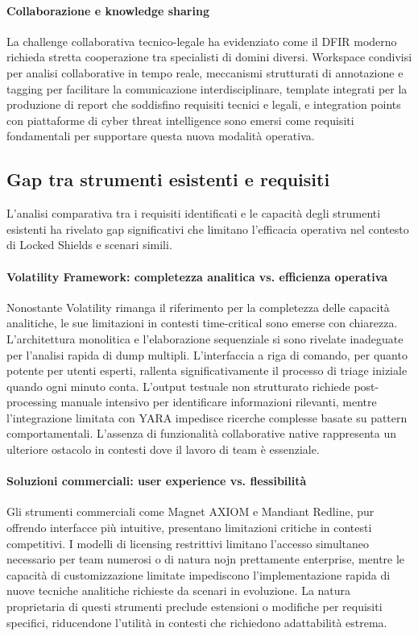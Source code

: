 \paragraph{Collaborazione e knowledge sharing}
La challenge collaborativa tecnico-legale ha evidenziato come il DFIR moderno richieda stretta cooperazione tra specialisti di domini diversi. Workspace condivisi per analisi collaborative in tempo reale, meccanismi strutturati di annotazione e tagging per facilitare la comunicazione interdisciplinare, template integrati per la produzione di report che soddisfino requisiti tecnici e legali, e integration points con piattaforme di cyber threat intelligence sono emersi come requisiti fondamentali per supportare questa nuova modalità operativa.

\subsection{Gap tra strumenti esistenti e requisiti}

L'analisi comparativa tra i requisiti identificati e le capacità degli strumenti esistenti ha rivelato gap significativi che limitano l'efficacia operativa nel contesto di Locked Shields e scenari simili.

\paragraph{Volatility Framework: completezza analitica vs. efficienza operativa}
Nonostante Volatility rimanga il riferimento per la completezza delle capacità analitiche, le sue limitazioni in contesti time-critical sono emerse con chiarezza. L'architettura monolitica e l'elaborazione sequenziale si sono rivelate inadeguate per l'analisi rapida di dump multipli. L'interfaccia a riga di comando, per quanto potente per utenti esperti, rallenta significativamente il processo di triage iniziale quando ogni minuto conta. L'output testuale non strutturato richiede post-processing manuale intensivo per identificare informazioni rilevanti, mentre l'integrazione limitata con YARA impedisce ricerche complesse basate su pattern comportamentali. L'assenza di funzionalità collaborative native rappresenta un ulteriore ostacolo in contesti dove il lavoro di team è essenziale.

\paragraph{Soluzioni commerciali: user experience vs. flessibilità}
Gli strumenti commerciali come Magnet AXIOM e Mandiant Redline, pur offrendo interfacce più intuitive, presentano limitazioni critiche in contesti competitivi. I modelli di licensing restrittivi limitano l'accesso simultaneo necessario per team numerosi o di natura nojn prettamente enterprise, mentre le capacità di customizzazione limitate impediscono l'implementazione rapida di nuove tecniche analitiche richieste da scenari in evoluzione. La natura proprietaria di questi strumenti preclude estensioni o modifiche per requisiti specifici, riducendone l'utilità in contesti che richiedono adattabilità estrema.


